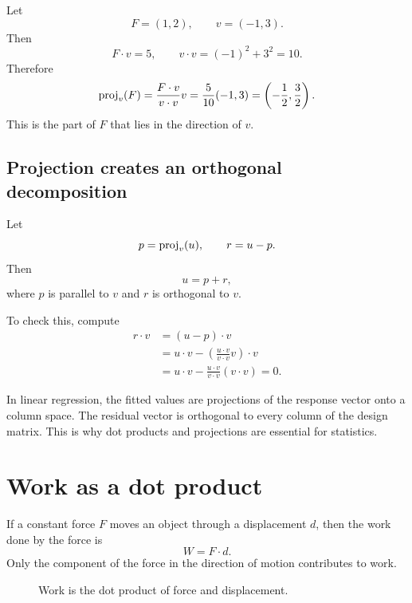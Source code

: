 \begin{examplebox}[title={Example 3.7: Projecting $(1,2)$ onto $(-1,3)$}]
Let
\[
  F=(1,2), \qquad v=(-1,3).
\]
Then
\[
  F\cdot v=5, \qquad v\cdot v=(-1)^2+3^2=10.
\]
Therefore
\[
  \operatorname{proj}_v(F)=\frac{F\cdot v}{v\cdot v}v
  =\frac{5}{10}(-1,3)
  =\left(-\frac12,\frac32\right).
\]
This is the part of $F$ that lies in the direction of $v$.
\end{examplebox}

\subsection*{Projection creates an orthogonal decomposition}

Let
\[
  p=\operatorname{proj}_v(u), \qquad r=u-p.
\]
Then
\[
  u=p+r,
\]
where $p$ is parallel to $v$ and $r$ is orthogonal to $v$.

To check this, compute
\[
\begin{aligned}
  r\cdot v
  &=(u-p)\cdot v \\
  &=u\cdot v-\left(\frac{u\cdot v}{v\cdot v}v\right)\cdot v \\
  &=u\cdot v-\frac{u\cdot v}{v\cdot v}(v\cdot v)=0.
\end{aligned}
\]

\begin{bridgebox}[title={Bridge to least squares}]
In linear regression, the fitted values are projections of the response vector onto a column space. The residual vector is orthogonal to every column of the design matrix. This is why dot products and projections are essential for statistics.
\end{bridgebox}

\section{Work as a dot product}

If a constant force $F$ moves an object through a displacement $d$, then the work done by the force is
\[
  W=F\cdot d.
\]
Only the component of the force in the direction of motion contributes to work.

\begin{figure}[H]
\centering
{}
\caption{Work is the dot product of force and displacement.}
\end{figure}

